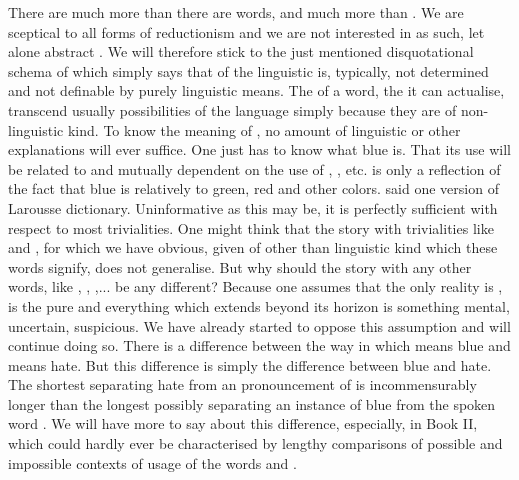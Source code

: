 \pa
There are much more  than there are words, and much more
 than . We are sceptical to all forms of reductionism
and we are not interested in  as such, let alone abstract
. We will therefore stick to 
the just mentioned disquotational schema of  which simply says that
 of the linguistic  is, typically, not determined and not
definable by purely linguistic means.  The  of a word, the
 it can actualise, transcend usually possibilities of the
language simply because they are of non-linguistic kind. To know the meaning of
, no amount of linguistic or other explanations will ever suffice. One
just has to know what blue is. That its use will be related to and mutually
dependent on the use of , , etc. is only a reflection of the
fact that blue is  relatively to green, red and other colors.
 said one version of Larousse
dictionary. Uninformative as this may be, it is perfectly sufficient with
respect to most trivialities.  One might think that the story with trivialities
like  and , for which we have obvious,  given
 of other than linguistic kind which these words signify, does
not generalise. But why should the story with any other words, like
, , ,... be any different?  Because one
assumes that the only reality is , is the pure 
and everything which extends beyond its horizon is something mental, uncertain,
suspicious. We have already started to oppose this assumption and will continue
doing so. There is a difference between the way in which  means blue
and  means hate. But this difference is simply the difference between
blue and hate. The shortest  separating hate from an 
pronouncement of  is incommensurably longer than the longest
 possibly separating an instance of blue from the 
spoken word . We will have more to say about this difference,
especially, in Book II, which could hardly ever be characterised by lengthy
comparisons of possible and impossible contexts of usage of the words 
and .  


